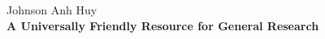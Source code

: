 %
%
%
% 
%

\begin{titlepage}
\newenvironment{bottompar}{\par\vspace*{\fill}}{\clearpage}

\raggedleft %
\vspace*{\baselineskip} %

{\Large Johnson Anh Huy}\\[0.167\textheight] %

{\LARGE\bfseries A Universally Friendly Resource for General Research}\\[\baselineskip] %

{\color{red}{\Huge Cavity Enhanced Absorption Spectroscopy and Gaussian Beam Profiler }}\\[\baselineskip] %

\vfill %

\vspace*{3\baselineskip} %
\flushleft
\end{titlepage}

